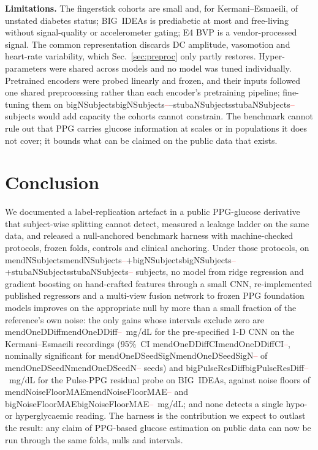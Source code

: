 \documentclass[journal]{IEEEtran}
\newcommand{\m}[1]{\ifcsname #1\endcsname\csname #1\endcsname\else\textcolor{red}{--}\fi}
\begin{document}
\textbf{Limitations.}  The fingerstick cohorts are small and, for
Kermani--Esmaeili, of unstated diabetes status; BIG~IDEAs is prediabetic at
most and free-living without signal-quality or accelerometer gating; E4 BVP
is a vendor-processed signal.  The common representation discards DC
amplitude, vasomotion and heart-rate variability, which Sec.~\ref{sec:preproc}
only partly restores.  Hyper-parameters were shared across models and no
model was tuned individually.  Pretrained encoders were probed linearly and
frozen, and their inputs followed one shared preprocessing rather than each
encoder's pretraining pipeline; fine-tuning them on
\m{bigNSubjects}--\m{stubaNSubjects} subjects would add capacity the cohorts
cannot constrain.  The benchmark cannot
rule out that PPG carries glucose information at scales or in populations
it does not cover; it bounds what can be claimed on the public data that
exists.

\section{Conclusion}
\label{sec:conclusion}
We documented a label-replication artefact in a public PPG-glucose
derivative that subject-wise splitting cannot detect, measured a leakage
ladder on the same data, and released a null-anchored benchmark harness
with machine-checked protocols, frozen folds, controls and clinical
anchoring.  Under those protocols, on \m{mendNSubjects}+\m{bigNSubjects}+\m{stubaNSubjects}
subjects, no model from ridge regression and gradient boosting on
hand-crafted features through a small CNN, re-implemented published
regressors and a multi-view fusion network to frozen PPG foundation models
improves on the appropriate null by more than a small fraction of the
reference's own noise: the only gains whose intervals exclude zero are
\m{mendOneDDiff}~mg/dL for the pre-specified 1-D CNN on the
Kermani--Esmaeili recordings (95\%~CI \m{mendOneDDiffCI}, nominally
significant for \m{mendOneDSeedSigN} of \m{mendOneDSeedN} seeds) and
\m{bigPulseResDiff}~mg/dL for the Pulse-PPG residual probe on BIG~IDEAs,
against noise floors of \m{mendNoiseFloorMAE} and
\m{bigNoiseFloorMAE}~mg/dL; and none detects a single hypo- or
hyperglycaemic reading.  The harness is the contribution we expect
to outlast the result: any claim of PPG-based glucose estimation on public
data can now be run through the same folds, nulls and intervals.
\end{document}
